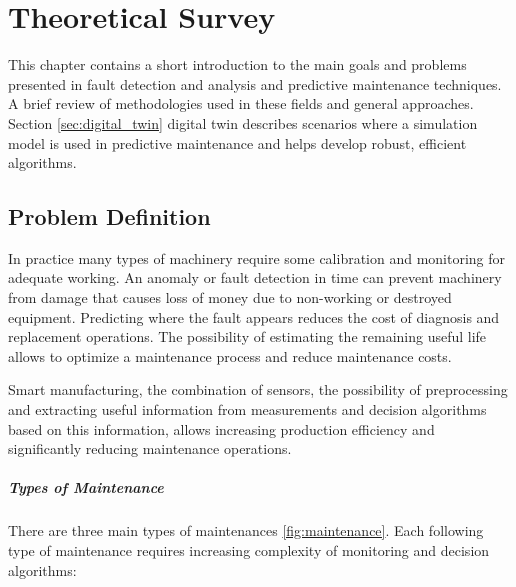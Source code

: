 
\chapter{Theoretical Survey}\label{ch:teor_surv}


This chapter contains a short introduction to the main goals and problems
presented in fault detection and analysis and predictive maintenance
techniques. A brief review of methodologies used in these fields and
general approaches. Section \ref{sec:digital_twin} digital twin describes scenarios where a
simulation model is used in predictive maintenance and helps develop
robust, efficient algorithms.

% 

\section{Problem Definition}


In practice many types of machinery require some calibration and monitoring
for adequate working. An anomaly or fault detection in time can prevent
machinery from damage that causes loss of money due to non-working or
destroyed equipment.  Predicting where the fault appears reduces the cost
of diagnosis and replacement operations. The possibility of estimating the
remaining useful life allows to optimize a maintenance process and reduce
maintenance costs.


Smart manufacturing, the combination of sensors, the possibility of
preprocessing and extracting useful information from measurements and
decision algorithms based on this information, allows increasing production
efficiency and significantly reducing maintenance operations.



\paragraph{Types of Maintenance} There are three main types of maintenances
\ref{fig:maintenance}. Each following type of maintenance requires
increasing complexity of monitoring
and decision algorithms:

